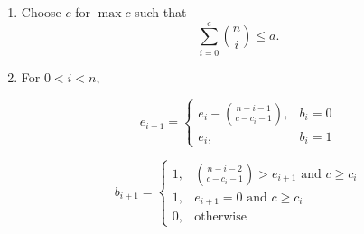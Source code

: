 \documentclass[a4paper,12pt]{article}
\begin{document}
\begin{enumerate}

\item Choose $c$ for $\max c$ such that
\begin{equation}
    \sum\limits_{i=0}^{c}\binom{n}{i}\leq a.
\end{equation}

\item For $0<i<n$,

\begin{equation}
    e_{i+1}=\begin{cases}
        e_i - \binom{n-i-1}{c-c_i-1}, & b_i=0 \\
        e_i, & b_i=1
    \end{cases}
\end{equation}

\begin{equation}
    b_{i+1}=\begin{cases}
        1, & \binom{n-i-2}{c-c_i-1} > e_{i+1} \text{ and } c \geq c_i \\
        1, & e_{i+1}=0 \text{ and } c \geq c_i \\
        0, & \text{otherwise}
    \end{cases}
\end{equation}

\end{enumerate}
\end{document}

